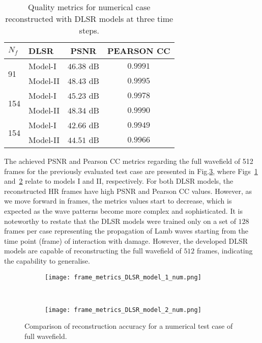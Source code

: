 \begin{table}[!ht]
	\renewcommand{\arraystretch}{1.3}
	\centering \footnotesize
	\caption{Quality metrics for numerical case reconstructed with DLSR models at three time steps.}	
	\begin{tabular}{llcc} 
		\toprule		
		$N_f$ & DLSR & PSNR & PEARSON CC\\
		\midrule
		\multirow{2}{*}{91} & Model-I  & \(46.38\) dB & \(0.9991\) \\
		 				   & Model-II & \(48.43\) dB & \(0.9995\) \\
		\midrule
		\multirow{2}{*}{154} & Model-I  & \(45.23\) dB & \(0.9978\) \\
							& Model-II & \(48.34\) dB & \(0.9990\) \\
		\midrule
		\multirow{2}{*}{154} & Model-I  & \(42.66\) dB & \(0.9949\) \\
							& Model-II & \(44.51\) dB & \(0.9966\) \\
		\bottomrule
	\end{tabular}	
	\label{tab:num_results}
\end{table}

The achieved PSNR and Pearson CC metrics regarding the full wavefield of 512 frames for the previously evaluated test case are presented in Fig.\ref{fig:num_case_475_metrics}, where Figs~\ref{fig:num_model_I} and~\ref{fig:num_model_II} relate to models I and II, respectively.
For both DLSR models, the reconstructed HR frames have high PSNR and Pearson CC values.
However, as we move forward in frames, the metrics values start to decrease, which is expected as the wave patterns become more complex and sophisticated.
It is noteworthy to restate that the DLSR models were trained only on a set of $128$ frames per case representing the propagation of Lamb waves starting from the time point (frame) of interaction with damage. 
However, the developed DLSR models are capable of reconstructing the full wavefield of $512$ frames, indicating the capability to generalise.
\begin{figure} [!ht]
	\centering
	\begin{subfigure}[b]{1\textwidth}
		\centering
		\texttt{[image: frame\_metrics\_DLSR\_model\_1\_num.png]}
		\caption{}
		\label{fig:num_model_I}
	\end{subfigure} \\
	\begin{subfigure}[b]{1\textwidth}
		\centering
		\texttt{[image: frame\_metrics\_DLSR\_model\_2\_num.png]}
		\caption{}
		\label{fig:num_model_II}
	\end{subfigure}
	\caption{Comparison of reconstruction accuracy for a numerical test case of full wavefield.}
	\label{fig:num_case_475_metrics}
\end{figure}
\clearpage

